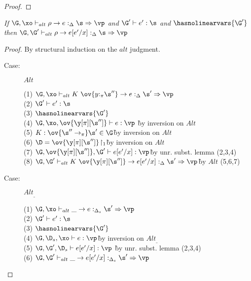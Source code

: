 \begin{proof}
\end{proof}

\begin{sublemma}
\emph{If $\G, \xo \vdash_{alt} \rho \to e :_\Delta \s \Rightarrow \vp$ and $\G' \vdash e' : \s$ and
    $\hasnolinearvars{\G'}$ then $\G, \G' \vdash_{alt} \rho \to e[e'/x] :_\Delta \s \Rightarrow \vp$}
\end{sublemma}

\begin{proof}
By structural induction on the $alt$ judgment.

\begin{description}
\item[Case:] $Alt$
\begin{tabbing}
    (1) $\G, \xo \vdash_{alt} K~\ov{y{:}_\pi\s''} \to e :_\Delta \s' \Rightarrow \vp$\\
    (2) $\G' \vdash e' : \s$\\
    (3) $\hasnolinearvars{\G'}$\\
    (4) $\G, \xo, \ov{\y[\pi][\s'']} \vdash e : \vp$ \` by inversion on $Alt$\\
    (5) $K : \ov{\s'' \to_\pi} \s' \in \G$\` by inversion on $Alt$\\
    (6) $\D = \ov{\y[\pi][\s'']}\!\upharpoonright_1$\` by inversion on $Alt$\\
    (7) $\G,\ov{\y[\pi][\s'']},\G' \vdash e[e'/x] : \vp$\` by unr. subst. lemma (2,3,4)\\
    (8) $\G, \G' \vdash_{alt} K~\ov{\y[\pi][\s'']} \to e[e'/x] :_\Delta \s' \Rightarrow \vp$\` by $Alt$ (5,6,7)\\
\end{tabbing}

\item[Case:] $Alt_\_$
\begin{tabbing}
    (1) $\G, \xo \vdash_{alt} \_ \to e :_{\Delta_s} \s' \Rightarrow \vp$\\
    (2) $\G' \vdash e' : \s$\\
    (3) $\hasnolinearvars{\G'}$\\
    (4) $\G, \D_s, \xo \vdash e : \vp$\` by inversion on $Alt_\_$\\
    (5) $\G, \G', \D_s \vdash e[e'/x] : \vp$ \` by unr. subst. lemma (2,3,4)\\
    (6) $\G ,\G' \vdash_{alt} \_ \to e[e'/x] :_{\Delta_s} \s' \Rightarrow \vp$\\
\end{tabbing}

\end{description}
\end{proof}
